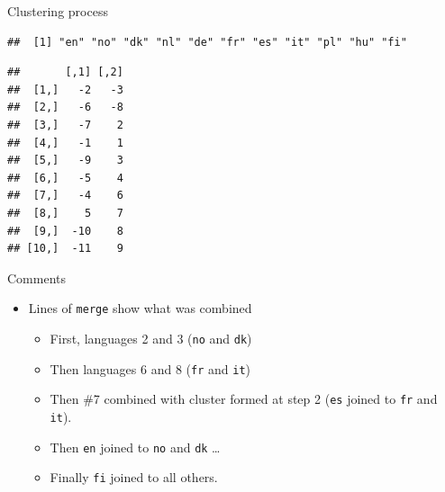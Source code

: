 \documentclass[ignorenonframetext,]{beamer}
\newenvironment{Shaded}{\begin{snugshade}}{\end{snugshade}}
\newcommand{\NormalTok}[1]{#1}
\newcommand{\OperatorTok}[1]{\textcolor[rgb]{0.81,0.36,0.00}{\textbf{#1}}}
\begin{document}
\begin{frame}[fragile]{Clustering process}
\protect\hypertarget{clustering-process}{}

\small

\begin{Shaded}
\end{Shaded}

\begin{verbatim}
##  [1] "en" "no" "dk" "nl" "de" "fr" "es" "it" "pl" "hu" "fi"
\end{verbatim}

\begin{Shaded}
\end{Shaded}

\begin{verbatim}
##       [,1] [,2]
##  [1,]   -2   -3
##  [2,]   -6   -8
##  [3,]   -7    2
##  [4,]   -1    1
##  [5,]   -9    3
##  [6,]   -5    4
##  [7,]   -4    6
##  [8,]    5    7
##  [9,]  -10    8
## [10,]  -11    9
\end{verbatim}

\normalsize

\end{frame}

\begin{frame}[fragile]{Comments}
\protect\hypertarget{comments-25}{}

\begin{itemize}
\item
  Lines of \texttt{merge} show what was combined

  \begin{itemize}
  \item
    First, languages 2 and 3 (\texttt{no} and \texttt{dk})
  \item
    Then languages 6 and 8 (\texttt{fr} and \texttt{it})
  \item
    Then \#7 combined with cluster formed at step 2 (\texttt{es} joined
    to \texttt{fr} and \texttt{it}).
  \item
    Then \texttt{en} joined to \texttt{no} and \texttt{dk} \ldots
  \item
    Finally \texttt{fi} joined to all others.
  \end{itemize}
\end{itemize}

\end{frame}
\end{document}
